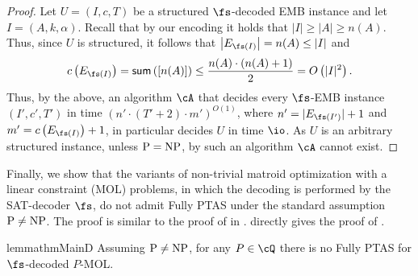 \begin{proof}
	Let $U = (I,c,T)$ be a structured $\fs$-decoded EMB instance and let $I = (A,k,\alpha)$. Recall that by our encoding it holds that $|I| \geq |A| \geq n(A)$. Thus, %
	since $U$ is structured, it follows that  $\left|E_{\fs(I)}\right| = n(A) \leq |I|$ and 
	$$c\left(E_{\fs(I)}\right) = \textsf{sum}\left(\left[n(A)\right]\right) \leq \frac{n(A) \cdot (n(A)+1)}{2} = O\left(|I|^2\right).$$
	Thus, by the above, an algorithm $\cA$ that decides every $\fs$-EMB  instance $(I',c',T')$ in time $(n' \cdot(T'+2) \cdot m')^{O(1)}$, where  $n' = |E_{\fs(I')}|+1$ and $m' = c\left(E_{\fs(I)}\right) +1$, in particular decides $U$ in time $\io$. As $U$ is an arbitrary structured instance, unless $\textnormal{P} = \textnormal{NP}$, by  such an algorithm $\cA$ cannot exist.  
\end{proof}


	Finally, %
	we show that %
the variants of non-trivial matroid optimization with a linear constraint (MOL) problems, in which the decoding is performed by the SAT-decoder $\fs$, do not admit Fully PTAS under the standard assumption $\textnormal{P} \neq \textnormal{NP}$.   The proof is similar to the proof of  in .  directly gives the proof of .

\begin{restatable}{lemma}{thmMainD}
	\label{thm:mainD}
	Assuming $\textnormal{P} \neq \textnormal{NP}$, for any $P \in \cQ$ there is no \textnormal{Fully PTAS} for $\fs$-\textnormal{decoded} $P$-\textnormal{MOL}. 
\end{restatable}

